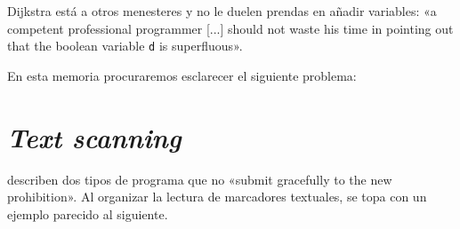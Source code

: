 \documentclass{tfg_domingo}
\begin{document}
Dijkstra está a otros menesteres y no le duelen prendas en
añadir variables: «a competent professional programmer [...]
should not waste his time in pointing out that the boolean
variable \texttt{d} is superfluous».

\begin{center}
\end{center}

En esta memoria procuraremos esclarecer el siguiente problema:

\begin{tcolorbox}
\lipsum[11]
\end{tcolorbox}


\chapter{\emph{Text scanning}}


\citet{1972_Knuth} describen dos tipos de programa que no
«submit gracefully to the new prohibition». Al organizar la
lectura de marcadores textuales, \citet[p. 271]{1974_Knuth}
se topa con un ejemplo parecido al siguiente.
\end{document}
